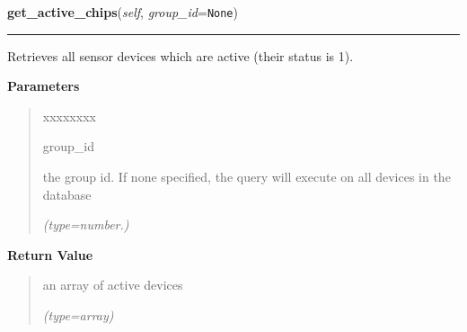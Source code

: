 \hspace{.8\funcindent}\begin{boxedminipage}{\funcwidth}

    \raggedright \textbf{get\_active\_chips}(\textit{self}, \textit{group\_id}={\tt None})

    \vspace{-1.5ex}

    \rule{\textwidth}{0.5\fboxrule}
\setlength{\parskip}{2ex}
    Retrieves all sensor devices which are active (their status is 1).

\setlength{\parskip}{1ex}
      \textbf{Parameters}
      \vspace{-1ex}

      \begin{quote}
        \begin{Ventry}{xxxxxxxx}

          \item[group\_id]

          the group id. If none specified, the query will execute on all 
          devices in the database

            {\it (type=number.)}

        \end{Ventry}

      \end{quote}

      \textbf{Return Value}
    \vspace{-1ex}

      \begin{quote}
      an array of active devices

      {\it (type=array)}

      \end{quote}

    \end{boxedminipage}

    \label{DBE:DBE:get_chip_coordinates}

    \vspace{0.5ex}

